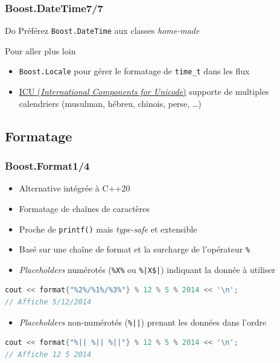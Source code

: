 \documentclass[C++.tex]{subfiles}
\begin{document}
\begin{frame}[fragile]
	\frametitle{Boost.DateTime\titlehfill{}7/7}
	\begin{exampleblock}{Do}
		Préférez \lstinline|Boost.DateTime| aux classes \textit{home-made}

	\end{exampleblock}

	\begin{block}{Pour aller plus loin}
		\begin{itemize}
			\item \lstinline|Boost.Locale| pour gérer le formatage de \lstinline|time_t| dans les flux


			\item \href{http://site.icu-project.org/}{ICU (\textit{International Components for Unicode})} supporte de multiples calendriers (musulman, hébreu, chinois, perse, \ldots)

		\end{itemize}
	\end{block}
\end{frame}

\subsection*{Formatage}
\begin{frame}[fragile]
	\frametitle{Boost.Format\titlehfill{}1/4}
	\begin{itemize}
		\item Alternative intégrée à C++20
		\item Formatage de chaînes de caractères
		\item Proche de \lstinline|printf()| mais \textit{type-safe} et extensible
		\item Basé sur une chaîne de format et la surcharge de l'opérateur \lstinline|%|
		\item \textit{Placeholders} numérotés (\lstinline|%X%| ou \lstinline+%|X$|+) indiquant la donnée à utiliser
	\end{itemize}

	\begin{lstlisting}[language=C++]
cout << format{"%2%/%1%/%3%"} % 12 % 5 % 2014 << '\n';
// Affiche 5/12/2014\end{lstlisting}

	\begin{itemize}
		\item \textit{Placeholders} non-numérotés (\lstinline+%||+) prenant les données dans l'ordre
	\end{itemize}

	\begin{lstlisting}[language=C++]
cout << format{"%|| %|| %||"} % 12 % 5 % 2014 << '\n';
// Affiche 12 5 2014\end{lstlisting}
\end{frame}
\end{document}
